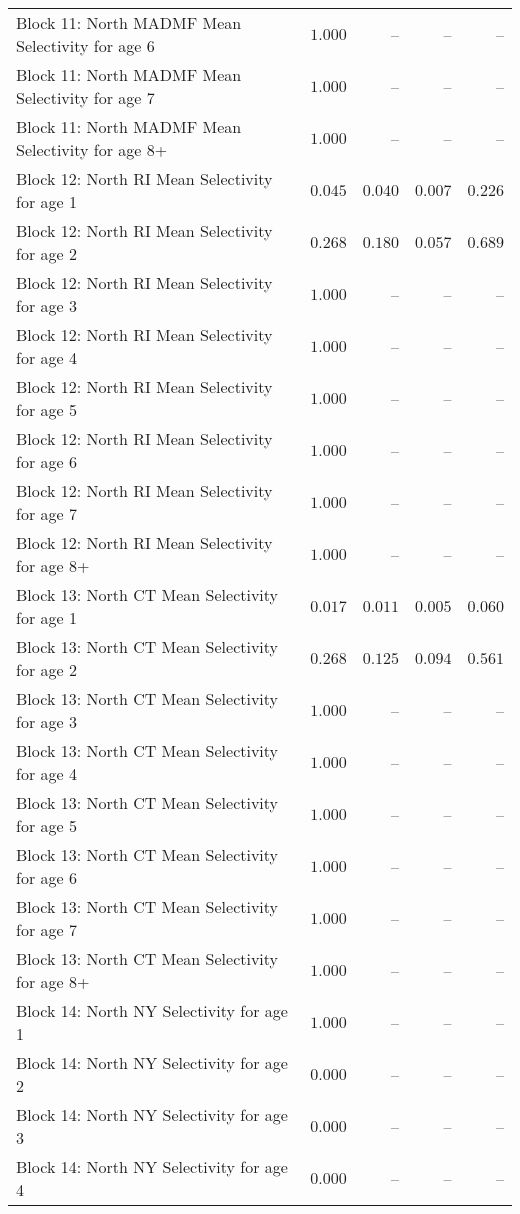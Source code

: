 \documentclass[
]{article}
\begin{document}
\begin{landscape}
\begin{longtable}[t]{lrrrr}
Block 11: North MADMF Mean Selectivity for age 6 & $1.000$ & -- & -- & --\\
Block 11: North MADMF Mean Selectivity for age 7 & $1.000$ & -- & -- & --\\
Block 11: North MADMF Mean Selectivity for age 8+ & $1.000$ & -- & -- & --\\
\addlinespace
Block 12: North RI Mean Selectivity for age 1 & $0.045$ & $0.040$ & $0.007$ & $0.226$\\
Block 12: North RI Mean Selectivity for age 2 & $0.268$ & $0.180$ & $0.057$ & $0.689$\\
Block 12: North RI Mean Selectivity for age 3 & $1.000$ & -- & -- & --\\
Block 12: North RI Mean Selectivity for age 4 & $1.000$ & -- & -- & --\\
Block 12: North RI Mean Selectivity for age 5 & $1.000$ & -- & -- & --\\
\addlinespace
Block 12: North RI Mean Selectivity for age 6 & $1.000$ & -- & -- & --\\
Block 12: North RI Mean Selectivity for age 7 & $1.000$ & -- & -- & --\\
Block 12: North RI Mean Selectivity for age 8+ & $1.000$ & -- & -- & --\\
Block 13: North CT Mean Selectivity for age 1 & $0.017$ & $0.011$ & $0.005$ & $0.060$\\
Block 13: North CT Mean Selectivity for age 2 & $0.268$ & $0.125$ & $0.094$ & $0.561$\\
\addlinespace
Block 13: North CT Mean Selectivity for age 3 & $1.000$ & -- & -- & --\\
Block 13: North CT Mean Selectivity for age 4 & $1.000$ & -- & -- & --\\
Block 13: North CT Mean Selectivity for age 5 & $1.000$ & -- & -- & --\\
Block 13: North CT Mean Selectivity for age 6 & $1.000$ & -- & -- & --\\
Block 13: North CT Mean Selectivity for age 7 & $1.000$ & -- & -- & --\\
\addlinespace
Block 13: North CT Mean Selectivity for age 8+ & $1.000$ & -- & -- & --\\
Block 14: North NY Selectivity for age 1 & $1.000$ & -- & -- & --\\
Block 14: North NY Selectivity for age 2 & $0.000$ & -- & -- & --\\
Block 14: North NY Selectivity for age 3 & $0.000$ & -- & -- & --\\
Block 14: North NY Selectivity for age 4 & $0.000$ & -- & -- & --\\

\end{longtable}
\end{landscape}
\end{document}
